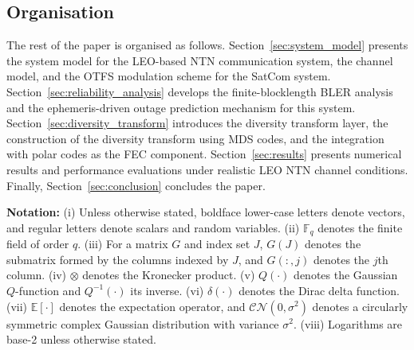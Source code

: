 \documentclass[lettersize,journal]{IEEEtran}
\begin{document}
\subsection{Organisation}
\label{sec:organisation}
The rest of the paper is organised as follows.
Section~\ref{sec:system_model} presents the system model for the LEO-based
NTN communication system, the channel model, and the OTFS modulation scheme
for the SatCom system.
Section~\ref{sec:reliability_analysis} develops the finite-blocklength BLER
analysis and the ephemeris-driven outage prediction mechanism for this system.
Section~\ref{sec:diversity_transform} introduces the diversity transform
layer, the construction of the diversity transform using MDS codes, and the integration with polar codes as the FEC component.
Section~\ref{sec:results} presents numerical results and performance
evaluations under realistic LEO NTN channel conditions. Finally,
Section~\ref{sec:conclusion} concludes the paper.

\textbf{Notation:} (i) Unless otherwise stated, boldface lower-case 
letters denote vectors, and regular letters denote scalars and random 
variables. (ii) $\mathbb{F}_q$ denotes the finite field of order $q$. 
(iii) For a matrix $G$ and index set $J$, $G(J)$ denotes the submatrix 
formed by the columns indexed by $J$, and $G(:,j)$ denotes the $j$th 
column. (iv) $\otimes$ denotes the Kronecker product. (v) 
$Q(\cdot)$ denotes the Gaussian $Q$-function and $Q^{-1}(\cdot)$ its 
inverse. (vi)  $\delta(\cdot)$ denotes the Dirac delta function. 
(vii) $\mathbb{E}[\cdot]$ denotes the expectation operator, and 
$\mathcal{CN}(0,\sigma^2)$ denotes a circularly symmetric complex 
Gaussian distribution with variance $\sigma^2$. (viii) Logarithms 
are base-2 unless otherwise stated.
\end{document}
